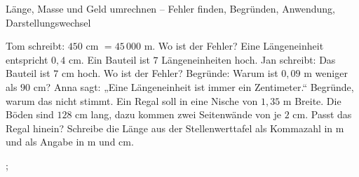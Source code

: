 \begin{aufgabe}{Länge, Masse und Geld umrechnen – Fehler finden, Begründen, Anwendung, Darstellungswechsel}
\begin{teile}
\teil Tom schreibt: $450$ cm $= 45\,000$ m. Wo ist der Fehler?
\teil Eine Längeneinheit entspricht $0{,}4$ cm. Ein Bauteil ist $7$ Längeneinheiten hoch. Jan schreibt: Das Bauteil ist $7$ cm hoch. Wo ist der Fehler?
\teil Begründe: Warum ist $0{,}09$ m weniger als $90$ cm?
\teil Anna sagt: „Eine Längeneinheit ist immer ein Zentimeter.“ Begründe, warum das nicht stimmt.
\teil Ein Regal soll in eine Nische von $1{,}35$ m Breite. Die Böden sind $128$ cm lang, dazu kommen zwei Seitenwände von je $2$ cm. Passt das Regal hinein?
\teil Schreibe die Länge aus der Stellenwerttafel als Kommazahl in m und als Angabe in m und cm.

\leerfeld[m] ; \leerfeld[m] \leerfeld[cm]
\end{teile}
\end{aufgabe}
